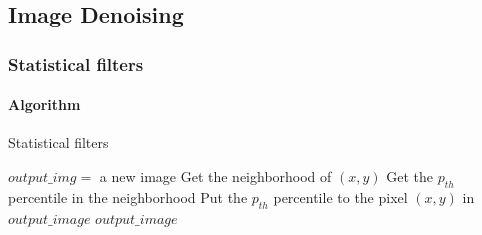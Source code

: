 \documentclass{article}
\begin{document}


\subsection{Image Denoising}

\subsubsection{Statistical filters}

\paragraph{Algorithm}
\begin{algorithm}
\centering
\caption{Statistical filters}
\label{alg:statfilt}
  \begin{algorithmic}[1]
        \State $output\_img = $ a new image  
	     
    		\State Get the neighborhood of $(x, y)$
    		\State Get the $p_{th}$ percentile in the neighborhood
    		\State Put the $p_{th}$ percentile to the pixel $(x, y)$ in $output\_image$
	    \EndFor
      \State \Return $output\_image$
    \EndFunction
\\
    	\State \Return {}
    \EndFunction
\\
    	\State \Return {}
    \EndFunction
\\
    	\State \Return {}
    \EndFunction
  \end{algorithmic}
\end{algorithm}
\end{document}
